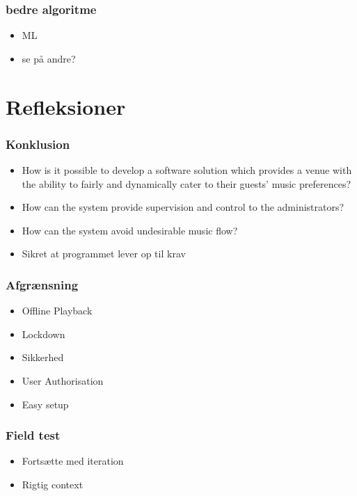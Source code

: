 \begin{frame}
	\frametitle{bedre algoritme}
	\begin{itemize}
		\item ML
		\item se på andre?
	\end{itemize}
\end{frame}

\section{Refleksioner}

\begin{frame}
	\frametitle{Konklusion}
	\begin{itemize}
		\item How is it possible to develop a software solution which provides a venue with the ability to fairly and dynamically cater to their guests’ music preferences?
		\item How can the system provide supervision and control to the administrators?
		\item How can the system avoid undesirable music flow?
		\item Sikret at programmet lever op til krav
	\end{itemize}
\end{frame}

\begin{frame}
	\frametitle{Afgrænsning}
	\begin{itemize}
		\item Offline Playback
		\item Lockdown
		\item Sikkerhed
		\item User Authorisation
		\item Easy setup
	\end{itemize}
\end{frame}

\begin{frame}
	\frametitle{Field test}
	\begin{itemize}
		\item Fortsætte med iteration
		\item Rigtig context
	\end{itemize}
\end{frame}

